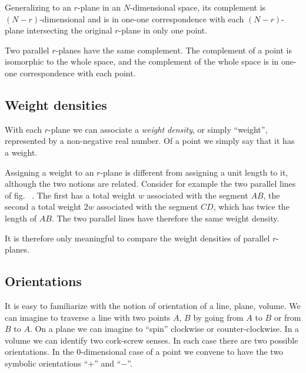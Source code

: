 \documentclass[\ifafour a4paper,12pt,\else a5paper,10pt,\fi%
onecolumn,oneside,article,%
british%
]{memoir}
\theoremstyle{remark}
\theoremstyle{innote}
\renewcommand*{\|}{\nonscript\,\vert\nonscript\;\mathopen{}}
\newcommand*{\fig}{fig.}%
\newcommand*{\puzzle}{{\fontencoding{U}\fontfamily{fontawesometwo}\selectfont\symbol{225}}}
\newcommand{\mynote}[1]{ {\color{notecolour}\puzzle\ #1}}
\newcommand*{\yr}{r}
\newcommand*{\yN}{N}
\newcommand*{\yw}{w}
\begin{document}
Generalizing to an $\yr$-plane in an $\yN$-dimensional space, its
complement is $(\yN-\yr)$-dimensional and is in one-one correspondence with
each $(\yN-\yr)$-plane intersecting the original $\yr$-plane in only one
point.

Two parallel $\yr$-planes have the same complement. The complement of a
point is isomorphic to the whole space, and the complement of the whole
space is in one-one correspondence with each point.




\subsection{Weight densities}
\label{sec:weight_densities}

With each $\yr$-plane we can associate a \emph{weight density}, or simply
\enquote{weight}, represented by a non-negative real number. Of a point we
simply say that it has a weight.

Assigning a weight to an $\yr$-plane is different from assigning a unit
length to it, although the two notions are related. Consider for example
the two parallel lines of \fig\mynote{}. The first has a total weight $\yw$
associated with the segment $AB$, the second a total weight $2\yw$
associated with the segment $CD$, which has twice the length of $AB$. The two
parallel lines have therefore the same weight density.

It is therefore only meaningful to compare the weight densities of parallel
$\yr$-planes.


\subsection{Orientations}
\label{sec:orientations2}

It is easy to familiarize with the notion of orientation of a line, plane,
volume. We can imagine to traverse a line with two points $A$, $B$ by going
from $A$ to $B$ or from $B$ to $A$. On a plane we can imagine to
\enquote{spin} clockwise or counter-clockwise. In a volume we can identify
two cork-screw senses. In each case there are two possible orientations. In
the $0$-dimensional case of a point we convene to have the two symbolic
orientations \enquote{$+$} and \enquote{$-$}. 
\end{document}
